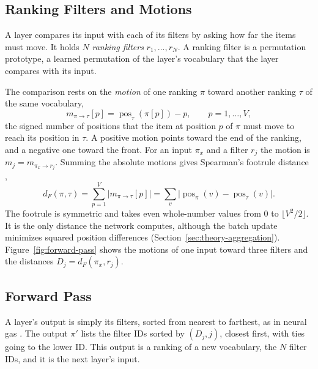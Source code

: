 \subsection{Ranking Filters and Motions}\label{sec:filters}

A layer compares its input with each of its filters by asking how far the items must move. It holds $N$ \emph{ranking filters} $r_1,\dots,r_N$. A ranking filter is a permutation prototype, a learned permutation of the layer's vocabulary that the layer compares with its input.

The comparison rests on the \emph{motion} of one ranking $\pi$ toward another ranking $\tau$ of the same vocabulary,
\begin{equation}
m_{\pi\to\tau}[p]=\operatorname{pos}_\tau(\pi[p])-p,\qquad p=1,\dots,V,
\label{eq:motion}
\end{equation}
the signed number of positions that the item at position $p$ of $\pi$ must move to reach its position in $\tau$. A positive motion points toward the end of the ranking, and a negative one toward the front. For an input $\pi_x$ and a filter $r_j$ the motion is $m_j=m_{\pi_x\to r_j}$. Summing the absolute motions gives Spearman's footrule distance \citep{diaconis1977footrule},
\begin{equation}
d_F(\pi,\tau)=\sum_{p=1}^{V}\bigl|m_{\pi\to\tau}[p]\bigr|=\sum_{v}\bigl|\operatorname{pos}_\pi(v)-\operatorname{pos}_\tau(v)\bigr|.
\label{eq:footrule}
\end{equation}
The footrule is symmetric and takes even whole-number values from $0$ to $\lfloor V^2/2\rfloor$. It is the only distance the network computes, although the batch update minimizes squared position differences (Section~\ref{sec:theory-aggregation}). Figure~\ref{fig:forward-pass} shows the motions of one input toward three filters and the distances $D_j=d_F(\pi_x,r_j)$.



\subsection{Forward Pass}\label{sec:forward}

A layer's output is simply its filters, sorted from nearest to farthest, as in neural gas \citep{martinetz1993neural}. The output $\pi'$ lists the filter IDs sorted by $(D_j,j)$, closest first, with ties going to the lower ID. This output is a ranking of a new vocabulary, the $N$ filter IDs, and it is the next layer's input.

